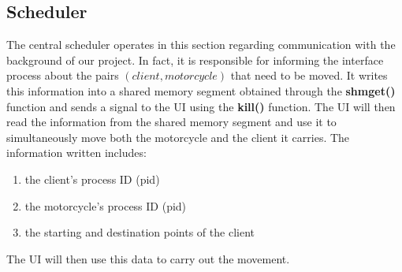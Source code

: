 \subsection{Scheduler}
The central scheduler operates in this section regarding communication with the background of our project. In fact, it is responsible for informing the interface process about the pairs $(client, motorcycle)$ that need to be moved. It writes this information into a shared memory segment obtained through the \textbf{shmget()} function and sends a signal to the UI using the \textbf{kill()} function. The UI will then read the information from the shared memory segment and use it to simultaneously move both the motorcycle and the client it carries. The information written includes:
\begin{enumerate}
    \item the client's process ID (pid)
    \item the motorcycle's process ID (pid)
    \item the starting and destination points of the client
\end{enumerate}
The UI will then use this data to carry out the movement.




